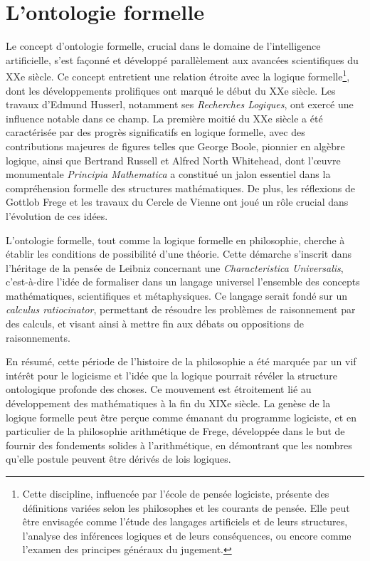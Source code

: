 \documentclass[12pt]{report}
\begin{document}
\section{L'ontologie formelle}
Le concept d'ontologie formelle, crucial dans le domaine de l'intelligence artificielle, s'est façonné et développé parallèlement aux avancées scientifiques du XXe siècle. Ce concept entretient une relation étroite avec la logique formelle\footnote{Cette discipline, influencée par l'école de pensée logiciste, présente des définitions variées selon les philosophes et les courants de pensée. Elle peut être envisagée comme l'étude des langages artificiels et de leurs structures, l'analyse des inférences logiques et de leurs conséquences, ou encore comme l'examen des principes généraux du jugement.}, dont les développements prolifiques ont marqué le début du XXe siècle. Les travaux d'Edmund Husserl, notamment ses \textit{Recherches Logiques}, ont exercé une influence notable dans ce champ. La première moitié du XXe siècle a été caractérisée par des progrès significatifs en logique formelle, avec des contributions majeures de figures telles que George Boole, pionnier en algèbre logique, ainsi que Bertrand Russell et Alfred North Whitehead, dont l'œuvre monumentale \textit{Principia Mathematica} a constitué un jalon essentiel dans la compréhension formelle des structures mathématiques. De plus, les réflexions de Gottlob Frege et les travaux du Cercle de Vienne ont joué un rôle crucial dans l'évolution de ces idées.

L'ontologie formelle, tout comme la logique formelle en philosophie, cherche à établir les conditions de possibilité d'une théorie. Cette démarche s'inscrit dans l'héritage de la pensée de Leibniz concernant une \textit{Characteristica Universalis}, c'est-à-dire l'idée de formaliser dans un langage universel l'ensemble des concepts mathématiques, scientifiques et métaphysiques. Ce langage serait fondé sur un \textit{calculus ratiocinator}, permettant de résoudre les problèmes de raisonnement par des calculs, et visant ainsi à mettre fin aux débats ou oppositions de raisonnements.

En résumé, cette période de l'histoire de la philosophie a été marquée par un vif intérêt pour le logicisme et l'idée que la logique pourrait révéler la structure ontologique profonde des choses. Ce mouvement est étroitement lié au développement des mathématiques à la fin du XIXe siècle. La genèse de la logique formelle peut être perçue comme émanant du programme logiciste, et en particulier de la philosophie arithmétique de Frege, développée dans le but de fournir des fondements solides à l'arithmétique, en démontrant que les nombres qu'elle postule peuvent être dérivés de lois logiques.
\end{document}
